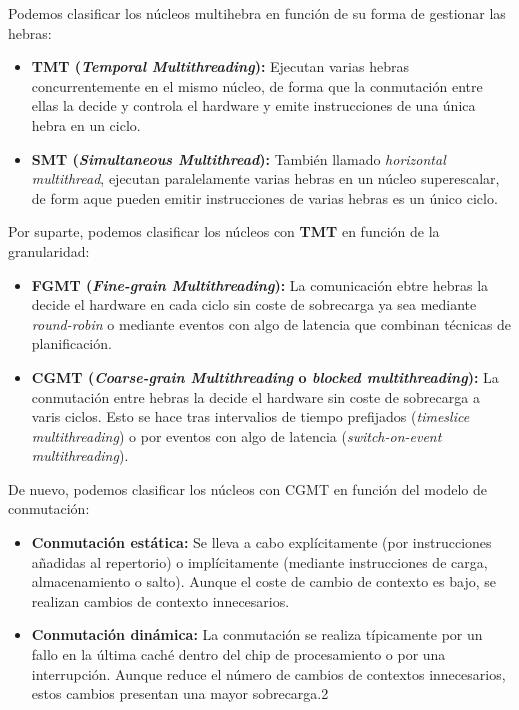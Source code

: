 Podemos clasificar los núcleos multihebra en función de su forma de gestionar las hebras:

\begin{itemize}
	\item\textbf{TMT (\textit{Temporal Multithreading}):} Ejecutan varias hebras concurrentemente en el mismo núcleo, de forma que la conmutación entre ellas la decide y controla el hardware y emite instrucciones de una única hebra en un ciclo.
	\item\textbf{SMT (\textit{Simultaneous Multithread}):} También llamado \textit{horizontal multithread}, ejecutan paralelamente varias hebras en un núcleo superescalar, de form aque pueden emitir instrucciones de varias hebras es un único ciclo.
\end{itemize}

Por suparte, podemos clasificar los núcleos con \textbf{TMT} en función de la granularidad:

\begin{itemize}
	\item\textbf{FGMT (\textit{Fine-grain Multithreading}):} La comunicación ebtre hebras la decide el hardware en cada ciclo sin coste de sobrecarga ya sea mediante \textit{round-robin} o mediante eventos con algo de latencia que combinan técnicas de planificación.
	\item\textbf{CGMT (\textit{Coarse-grain Multithreading} o \textit{blocked multithreading}):} La conmutación entre hebras la decide el hardware sin coste de sobrecarga a varis ciclos. Esto se hace tras intervalios de tiempo prefijados (\textit{timeslice multithreading}) o por eventos con algo de latencia (\textit{switch-on-event multithreading}).
\end{itemize}

De nuevo, podemos clasificar los núcleos con CGMT en función del modelo de conmutación:

\begin{itemize}
	\item\textbf{Conmutación estática:} Se lleva a cabo explícitamente (por instrucciones añadidas al repertorio) o implícitamente (mediante instrucciones de carga, almacenamiento o salto). Aunque el coste de cambio de contexto es bajo, se realizan cambios de contexto innecesarios.
	\item\textbf{Conmutación dinámica:} La conmutación se realiza típicamente por un fallo en la última caché dentro del chip de procesamiento o por una interrupción. Aunque reduce el número de cambios de contextos innecesarios, estos cambios presentan una mayor sobrecarga.2
\end{itemize}

